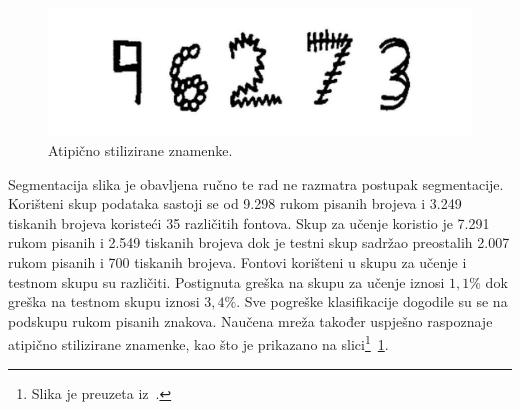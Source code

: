 \begin{figure}[htb]
    \centering
    \includegraphics[width=12cm]{images/chapter2/atypical-data.png}
    \caption{Atipično stilizirane znamenke.}
    \label{fig:atipicno-stilizirane-znamenke}
\end{figure}
Segmentacija slika je obavljena ručno te rad ne razmatra postupak segmentacije. Korišteni skup podataka sastoji se od
9.298 rukom pisanih brojeva i 3.249 tiskanih brojeva koristeći 35 različitih fontova. Skup za učenje koristio je 7.291
rukom pisanih i 2.549 tiskanih brojeva dok je testni skup sadržao preostalih 2.007 rukom pisanih i 700 tiskanih brojeva.
Fontovi korišteni u skupu za učenje i testnom skupu su različiti. Postignuta greška na skupu za učenje iznosi $1{,}1\%$
dok greška na testnom skupu iznosi $3{,}4\%$. Sve pogreške klasifikacije dogodile su se na podskupu rukom pisanih
znakova. Naučena mreža također uspješno raspoznaje atipično stilizirane znamenke, kao što je prikazano na
slici\footnote{Slika je preuzeta iz\ \citep{leCun1990}.}\ \ref{fig:atipicno-stilizirane-znamenke}.

